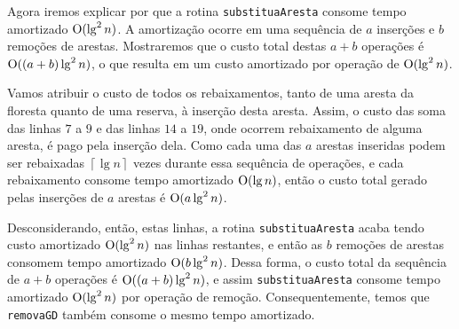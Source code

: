Agora iremos explicar por que a rotina \texttt{substituaAresta} consome tempo amortizado $\mathrm{O}(\lg^2 n)$. A amortização ocorre em uma sequência de $a$ inserções e $b$ remoções de arestas. Mostraremos que o custo total destas $a + b$ operações é $\mathrm{O}((a + b) \lg^2 n)$, o que resulta em um custo amortizado por operação de $\mathrm{O}(\lg^2 n)$. 

Vamos atribuir o custo de todos os rebaixamentos, tanto de uma aresta da floresta quanto de uma reserva, à inserção desta aresta. Assim, o custo das soma das linhas $7$ a $9$ e das linhas $14$ a $19$, onde ocorrem rebaixamento  de alguma aresta, é pago pela inserção dela. Como cada uma das $a$ arestas inseridas podem ser rebaixadas $\left\lceil \lg n \right\rceil$ vezes durante essa sequência de operações, e cada rebaixamento consome tempo amortizado $\mathrm{O}(\lg n)$, então o custo total gerado pelas inserções de $a$ arestas é $\mathrm{O}(a \lg^2 n)$. 

Desconsiderando, então, estas linhas, a rotina \texttt{substituaAresta} acaba tendo custo amortizado $\mathrm{O}(\lg^2 n)$ nas linhas restantes, e então as $b$ remoções de arestas consomem tempo amortizado $\mathrm{O}(b \lg^2 n)$. Dessa forma, o custo total da sequência de $a + b$ operações é $\mathrm{O}((a + b)\lg^2 n)$, e assim \texttt{substituaAresta} consome tempo amortizado $\mathrm{O}(\lg^2 n)$ por operação de remoção. Consequentemente, temos que \texttt{removaGD} também consome o mesmo tempo amortizado.
